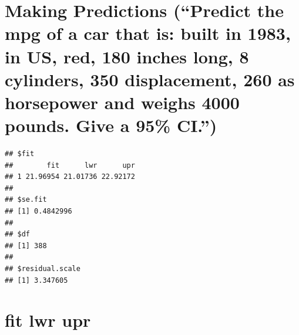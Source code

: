 \documentclass[]{article}
\newenvironment{Shaded}{\begin{snugshade}}{\end{snugshade}}
\newcommand{\KeywordTok}[1]{\textcolor[rgb]{0.13,0.29,0.53}{\textbf{#1}}}
\newcommand{\DataTypeTok}[1]{\textcolor[rgb]{0.13,0.29,0.53}{#1}}
\newcommand{\DecValTok}[1]{\textcolor[rgb]{0.00,0.00,0.81}{#1}}
\newcommand{\StringTok}[1]{\textcolor[rgb]{0.31,0.60,0.02}{#1}}
\newcommand{\OtherTok}[1]{\textcolor[rgb]{0.56,0.35,0.01}{#1}}
\newcommand{\OperatorTok}[1]{\textcolor[rgb]{0.81,0.36,0.00}{\textbf{#1}}}
\newcommand{\NormalTok}[1]{#1}
\begin{document}
\section{\texorpdfstring{Making Predictions (``Predict the mpg of a car
that is: built in 1983, in US, red, 180 inches long, 8 cylinders, 350
displacement, 260 as horsepower and weighs 4000 pounds. Give a 95\%
CI.'')}{Making Predictions (Predict the mpg of a car that is: built in 1983, in US, red, 180 inches long, 8 cylinders, 350 displacement, 260 as horsepower and weighs 4000 pounds. Give a 95\% CI.)}}\label{making-predictions-predict-the-mpg-of-a-car-that-is-built-in-1983-in-us-red-180-inches-long-8-cylinders-350-displacement-260-as-horsepower-and-weighs-4000-pounds.-give-a-95-ci.}

\begin{Shaded}
\end{Shaded}

\begin{verbatim}
## $fit
##        fit      lwr      upr
## 1 21.96954 21.01736 22.92172
## 
## $se.fit
## [1] 0.4842996
## 
## $df
## [1] 388
## 
## $residual.scale
## [1] 3.347605
\end{verbatim}

\section{fit lwr upr}\label{fit-lwr-upr}
\end{document}
